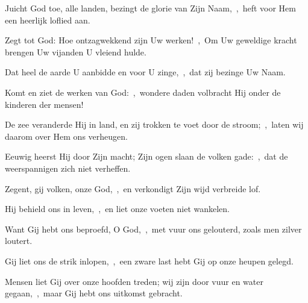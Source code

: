 \documentclass[12pt,twoside,a5paper]{article}
\begin{document}


\begin{halfparskip}
  Juicht God toe, alle landen, bezingt de glorie van Zijn Naam,~\sep\ heft voor Hem een heerlijk loflied aan.


  Zegt tot God: Hoe ontzagwekkend zijn Uw werken!~\sep\ Om Uw geweldige kracht brengen Uw vijanden U
  vleiend hulde.

  Dat heel de aarde U aanbidde en voor U zinge,~\sep\ dat zij bezinge Uw Naam.
\end{halfparskip}


\begin{halfparskip}
  Komt en ziet de werken van God:~\sep\ wondere daden volbracht Hij onder de kinderen der mensen!

  De zee veranderde Hij in land, en zij trokken te voet door de stroom;~\sep\ laten wij daarom over Hem ons verheugen.

  Eeuwig heerst Hij door Zijn macht; Zijn ogen slaan de volken gade:~\sep\ dat de weerspannigen zich niet verheffen.

  Zegent, gij volken, onze God,~\sep\ en verkondigt Zijn wijd verbreide lof.

  Hij behield ons in leven,~\sep\ en liet onze voeten niet wankelen.

  Want Gij hebt ons beproefd, O God,~\sep\ met vuur ons gelouterd, zoals men zilver loutert.

  Gij liet ons de strik inlopen,~\sep\ een zware last hebt Gij op onze heupen gelegd.

  Mensen liet Gij over onze hoofden treden; wij zijn door vuur en water gegaan,~\sep\ maar Gij hebt ons uitkomst gebracht.
\end{halfparskip}

\end{document}
